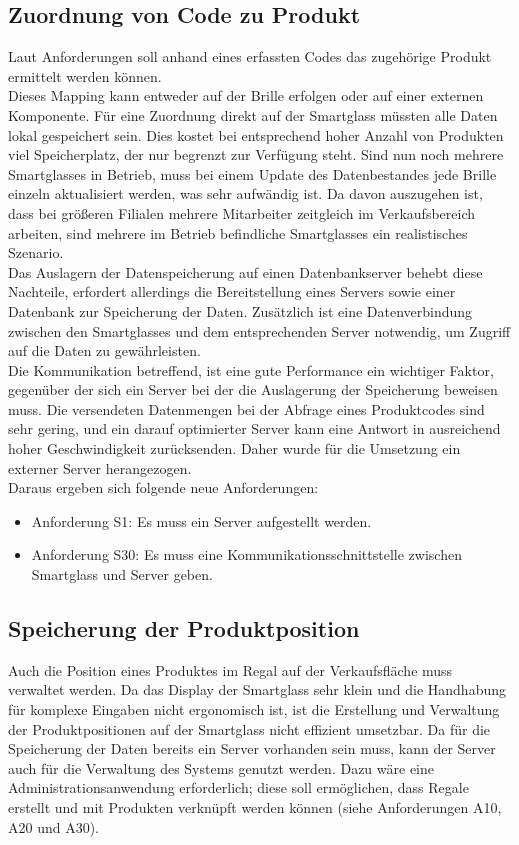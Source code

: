 \subsection{Zuordnung von Code zu Produkt}
Laut Anforderungen soll anhand eines erfassten Codes das zugehörige Produkt ermittelt werden können.\\
Dieses Mapping kann entweder auf der Brille erfolgen oder auf einer externen Komponente. Für eine Zuordnung direkt auf der Smartglass müssten alle Daten lokal gespeichert sein. Dies kostet bei entsprechend hoher Anzahl von Produkten viel Speicherplatz, der nur begrenzt zur Verfügung steht. Sind nun noch mehrere Smartglasses in Betrieb, muss bei einem Update des Datenbestandes jede Brille einzeln aktualisiert werden, was sehr aufwändig ist. Da davon auszugehen ist, dass bei größeren Filialen mehrere Mitarbeiter zeitgleich im Verkaufsbereich arbeiten, sind mehrere im Betrieb befindliche Smartglasses ein realistisches Szenario.\\
Das Auslagern der Datenspeicherung auf einen Datenbankserver behebt diese Nachteile, erfordert allerdings die Bereitstellung eines Servers sowie einer Datenbank zur Speicherung der Daten. Zusätzlich ist eine Datenverbindung zwischen den Smartglasses und dem entsprechenden Server notwendig, um Zugriff auf die Daten zu gewährleisten.\\
Die Kommunikation betreffend, ist eine gute Performance ein wichtiger Faktor, gegenüber der sich ein Server bei der die Auslagerung der Speicherung beweisen muss. Die versendeten Datenmengen bei der Abfrage eines Produktcodes sind sehr gering, und ein darauf optimierter Server kann eine Antwort in ausreichend hoher Geschwindigkeit zurücksenden. Daher wurde für die Umsetzung ein externer Server herangezogen.\\

Daraus ergeben sich folgende neue Anforderungen: 
\begin{itemize}
	\item Anforderung S1: Es muss ein Server aufgestellt werden.
	\item Anforderung S30: Es muss eine Kommunikationsschnittstelle zwischen Smartglass und Server geben.
\end{itemize}

\subsection{Speicherung der Produktposition}
Auch die Position eines Produktes im Regal auf der Verkaufsfläche muss verwaltet werden. Da das Display der Smartglass sehr klein und die Handhabung für komplexe Eingaben nicht ergonomisch ist, ist die Erstellung und Verwaltung der Produktpositionen auf der Smartglass nicht effizient umsetzbar. Da für die Speicherung der Daten bereits ein Server vorhanden sein muss, kann der Server auch für die Verwaltung des Systems genutzt werden. Dazu wäre eine Administrationsanwendung erforderlich; diese soll ermöglichen, dass Regale erstellt und mit Produkten verknüpft werden können (siehe Anforderungen A10, A20 und A30).\\

